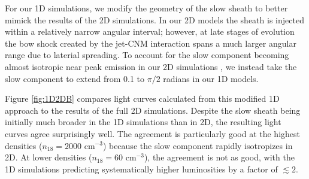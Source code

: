 \documentclass[usenatbib,fleqn]{mnras}
\begin{document}
For our 1D simulations, we modify the geometry of the slow sheath to
better mimick the results of the 2D simulations.  In our 2D models the
sheath is injected within a relatively narrow angular interval;
however, at late stages of evolution the bow shock created by the
jet-CNM interaction spans a much larger angular range due to laterial
spreading.  To account for the slow component becoming almost
isotropic near peak emission in our 2D simulations \citep[bottom two
panels of Fig.~8 in][]{Mimica+2015}, we instead take the slow
component to extend from 0.1 to $\pi/2$ radians in our 1D models.

Figure \ref{fig:1D2DB} compares light curves calculated from this
modified 1D approach to the results of the full 2D simulations.
Despite the slow sheath being initially much broader in the 1D
simulations than in 2D, the resulting light curves agree surprisingly
well.  The agreement is particularly good at the highest densities
($n_{18}=2000$ cm$^{-3}$) because the slow component rapidly
isotropizes in 2D.  At lower densities ($n_{18}=60$ cm$^{-3}$), the
agreement is not as good, with the 1D simulations predicting
systematically higher luminosities by a factor of $\lesssim 2$.


\end{document}
